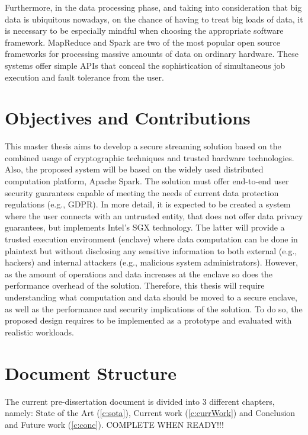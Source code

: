 Furthermore, in the data processing phase, and taking into consideration that big data is ubiquitous nowadays, on the chance of having to treat big loads of data, it is necessary to be especially mindful when choosing the appropriate software framework. MapReduce and Spark are two of the most popular open source frameworks for processing massive amounts of data on ordinary hardware. These systems offer simple APIs that conceal the sophistication of simultaneous job execution and fault tolerance from the user. \cite{mapreducevsspark}


\section{Objectives and Contributions}
This master thesis aims to develop a secure streaming solution based on the combined usage of cryptographic techniques and trusted hardware technologies. Also, the proposed system will be based on the widely used distributed computation platform, Apache Spark. The solution must offer end-to-end user security guarantees capable of meeting the needs of current data protection regulations (e.g., GDPR). In more detail, it is expected to be created a system where the user connects with an untrusted entity, that does not offer data privacy guarantees, but implements Intel’s SGX technology. The latter will provide a trusted execution environment (enclave) where data computation can be done in plaintext but without disclosing any sensitive information to both external (e.g., hackers) and internal attackers (e.g., malicious system administrators). However, as the amount of operations and data increases at the enclave so does the performance overhead of the solution. Therefore, this thesis will require understanding what computation and data should be moved to a secure enclave, as well as the performance and security implications of the solution. To do so, the proposed design requires to be implemented as a prototype and evaluated with realistic workloads. 

\section{Document Structure}
The current pre-dissertation document is divided into 3 different chapters, namely: State of the Art (\ref{c:sota}), Current work (\ref{c:currWork}) and Conclusion and Future work (\ref{c:conc}). COMPLETE WHEN READY!!!